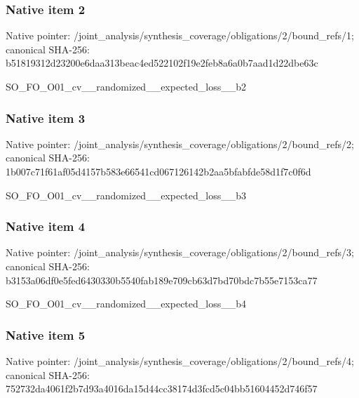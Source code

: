\documentclass[10pt,a4paper]{article}
\begin{document}
\subsubsection{Native item 2}
Native pointer: /joint\_\allowbreak{}analysis/synthesis\_\allowbreak{}coverage/obligations/2/bound\_\allowbreak{}refs/1; canonical SHA-256: b51819312d23200e6daa313beac4ed522102f19e2feb8a6a0b7aad1d22dbe63c

\begingroup\raggedright\sloppy SO\_\allowbreak{}FO\_\allowbreak{}O01\_\allowbreak{}cv\_\allowbreak{}\_\allowbreak{}randomized\_\allowbreak{}\_\allowbreak{}expected\_\allowbreak{}loss\_\allowbreak{}\_\allowbreak{}b2\par\endgroup

\subsubsection{Native item 3}
Native pointer: /joint\_\allowbreak{}analysis/synthesis\_\allowbreak{}coverage/obligations/2/bound\_\allowbreak{}refs/2; canonical SHA-256: 1b007c71f61af05d4157b583e66541cd067126142b2aa5bfabfde58d1f7c0f6d

\begingroup\raggedright\sloppy SO\_\allowbreak{}FO\_\allowbreak{}O01\_\allowbreak{}cv\_\allowbreak{}\_\allowbreak{}randomized\_\allowbreak{}\_\allowbreak{}expected\_\allowbreak{}loss\_\allowbreak{}\_\allowbreak{}b3\par\endgroup

\subsubsection{Native item 4}
Native pointer: /joint\_\allowbreak{}analysis/synthesis\_\allowbreak{}coverage/obligations/2/bound\_\allowbreak{}refs/3; canonical SHA-256: b3153a06df0e5fed6430330b5540fab189e709cb63d7bd70bdc7b55e7153ca77

\begingroup\raggedright\sloppy SO\_\allowbreak{}FO\_\allowbreak{}O01\_\allowbreak{}cv\_\allowbreak{}\_\allowbreak{}randomized\_\allowbreak{}\_\allowbreak{}expected\_\allowbreak{}loss\_\allowbreak{}\_\allowbreak{}b4\par\endgroup

\subsubsection{Native item 5}
Native pointer: /joint\_\allowbreak{}analysis/synthesis\_\allowbreak{}coverage/obligations/2/bound\_\allowbreak{}refs/4; canonical SHA-256: 752732da4061f2b7d93a4016da15d44cc38174d3fcd5c04bb51604452d746f57
\end{document}
